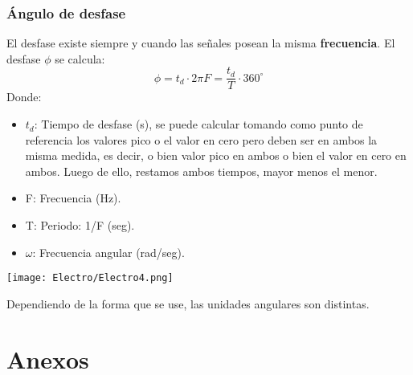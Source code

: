 \documentclass[
	12pt, %
	fleqn, %
	a4paper, %
]{LegrandOrangeBook}
\begin{document}
\section{Ángulo de desfase}
\begin{definition}
El desfase existe siempre y cuando las señales posean la misma \textbf{frecuencia}.
El desfase $\phi$ se calcula:
\begin{equation}
\phi=t_d\cdot 2\pi F=\frac{t_d}{T}\cdot 360^{\circ}
\label{eq:desfase}
\end{equation}
Donde:
\begin{itemize}
\item $t_d$: Tiempo de desfase (s), se puede calcular tomando como punto de referencia los valores pico o el valor en cero pero deben ser en ambos la misma medida, es decir, o bien valor pico en ambos o bien el valor en cero en ambos. Luego de ello, restamos ambos tiempos, mayor menos el menor.
\item F: Frecuencia (Hz).
\item T: Periodo: 1/F (seg).
\item $\omega$: Frecuencia angular (rad/seg).
\end{itemize}
\begin{center}
\texttt{[image: Electro/Electro4.png]}
\end{center}
Dependiendo de la forma que se use, las unidades angulares son distintas.
\end{definition}
\part{Anexos}



\end{document}
